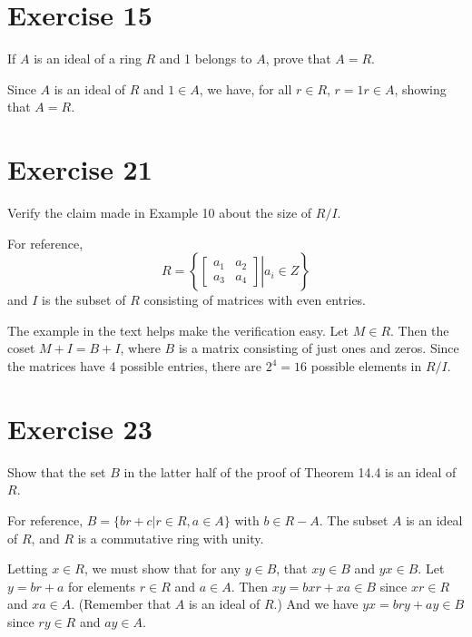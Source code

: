 \documentclass[12pt]{article}
\begin{document}
\section*{Exercise 15}

If $A$ is an ideal of a ring $R$ and 1 belongs to $A$, prove that $A=R$.

Since $A$ is an ideal of $R$ and $1\in A$, we have, for all $r\in R$, $r=1r\in A$,
showing that $A=R$.

\section*{Exercise 21}

Verify the claim made in Example 10 about the size of $R/I$.

For reference,
\begin{equation*}
R=\left\{\left.\left[\begin{array}{cc}a_1&a_2\\a_3&a_4\end{array}\right]\right|a_i\in Z\right\}
\end{equation*}
and $I$ is the subset of $R$ consisting of matrices with even entries.

The example in the text helps make the verification easy.  Let $M\in R$.
Then the coset $M+I=B+I$, where $B$ is a matrix consisting of just ones
and zeros.  Since the matrices have 4 possible entries, there are $2^4=16$
possible elements in $R/I$.

\section*{Exercise 23}

Show that the set $B$ in the latter half of the proof of Theorem 14.4 is an
ideal of $R$.

For reference, $B=\{br+c|r\in R, a\in A\}$ with $b\in R-A$.  The subset $A$ is an ideal
of $R$, and $R$ is a commutative ring with unity.

Letting $x\in R$, we must show that for any $y\in B$, that $xy\in B$ and $yx\in B$.
Let $y=br+a$ for elements $r\in R$ and $a\in A$.
Then $xy=bxr+xa\in B$ since $xr\in R$ and $xa\in A$.  (Remember that $A$ is
an ideal of $R$.)  And we have $yx=bry+ay\in B$ since $ry\in R$ and $ay\in A$.
\end{document}

